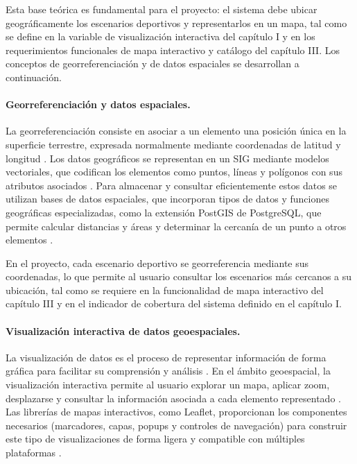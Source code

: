 Esta base te\'orica es fundamental para el proyecto: el sistema debe ubicar
geogr\'aficamente los escenarios deportivos y representarlos en un mapa, tal
como se define en la variable de visualizaci\'on interactiva del cap\'itulo I y
en los requerimientos funcionales de mapa interactivo y cat\'alogo del
cap\'itulo III. Los conceptos de georreferenciaci\'on y de datos espaciales se
desarrollan a continuaci\'on.

\paragraph{Georreferenciaci\'on y datos espaciales.} La georreferenciaci\'on
consiste en asociar a un elemento una posici\'on \'unica en la superficie
terrestre, expresada normalmente mediante coordenadas de latitud y longitud
\citep{longley2015}. Los datos geogr\'aficos se representan en un SIG mediante
modelos vectoriales, que codifican los elementos como puntos, l\'ineas y
pol\'igonos con sus atributos asociados \citep{longley2015}. Para almacenar y
consultar eficientemente estos datos se utilizan bases de datos espaciales,
que incorporan tipos de datos y funciones geogr\'aficas especializadas, como la
extensi\'on PostGIS de PostgreSQL, que permite calcular distancias y \'areas y
determinar la cercan\'ia de un punto a otros elementos \citep{postgresql}.

En el proyecto, cada escenario deportivo se georreferencia mediante sus
coordenadas, lo que permite al usuario consultar los escenarios m\'as cercanos
a su ubicaci\'on, tal como se requiere en la funcionalidad de mapa interactivo
del cap\'itulo III y en el indicador de cobertura del sistema definido en el
cap\'itulo I.

\paragraph{Visualizaci\'on interactiva de datos geoespaciales.} La
visualizaci\'on de datos es el proceso de representar informaci\'on de forma
gr\'afica para facilitar su comprensi\'on y an\'alisis \citep{longley2015}. En el
\'ambito geoespacial, la visualizaci\'on interactiva permite al usuario
explorar un mapa, aplicar zoom, desplazarse y consultar la informaci\'on
asociada a cada elemento representado \citep{longley2015}. Las librer\'ias de
mapas interactivos, como Leaflet, proporcionan los componentes necesarios
(marcadores, capas, popups y controles de navegaci\'on) para construir este
tipo de visualizaciones de forma ligera y compatible con m\'ultiples
plataformas \citep{leaflet}.

